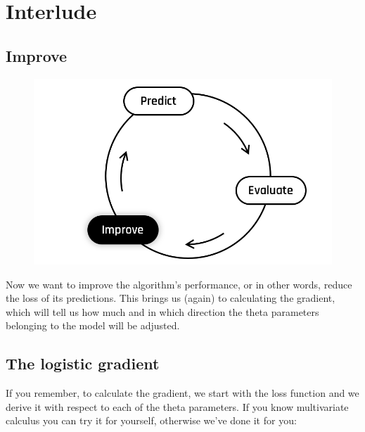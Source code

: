 
\section*{Interlude}
\subsection*{Improve}
\begin{figure}[!h]
    \centering
    \includegraphics[scale=0.25]{assets/Improve.png}
\end{figure}

Now we want to improve the algorithm's performance, or in other words, reduce the loss of its predictions.
This brings us (again) to calculating the gradient, which will tell us how much and in which direction the theta parameters belonging to the model will be adjusted.

\newpage

\subsection*{The logistic gradient}
If you remember, to calculate the gradient, we start with the loss function and we derive it with respect to each of the theta parameters.
If you know multivariate calculus you can try it for yourself, otherwise we've done it for you:


